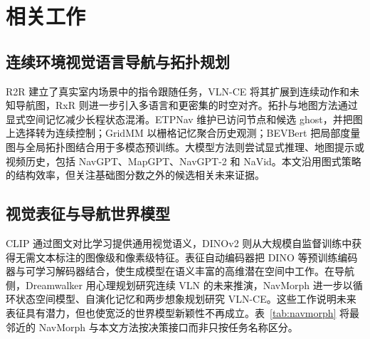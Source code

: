 \documentclass[UTF8,11pt]{ctexart}
\begin{document}
\section{相关工作}

\subsection{连续环境视觉语言导航与拓扑规划}

R2R 建立了真实室内场景中的指令跟随任务\cite{anderson2018r2r}，VLN-CE 将其扩展到连续动作和未知导航图\cite{krantz2020vlnce}，RxR 则进一步引入多语言和更密集的时空对齐\cite{ku2020rxr}。拓扑与地图方法通过显式空间记忆减少长程状态混淆。ETPNav 维护已访问节点和候选 ghost，并把图上选择转为连续控制\cite{an2025etpnav}；GridMM 以栅格记忆聚合历史观测\cite{wang2023gridmm}；BEVBert 把局部度量图与全局拓扑图结合用于多模态预训练\cite{an2023bevbert}。大模型方法则尝试显式推理、地图提示或视频历史，包括 NavGPT、MapGPT、NavGPT-2 和 NaVid\cite{zhou2024navgpt,chen2024mapgpt,zhou2024navgpt2,zhang2024navid}。本文沿用图式策略的结构效率，但关注基础图分数之外的候选相关未来证据。

\subsection{视觉表征与导航世界模型}

CLIP 通过图文对比学习提供通用视觉语义\cite{radford2021clip}，DINOv2 则从大规模自监督训练中获得无需文本标注的图像级和像素级特征\cite{oquab2023dinov2}。表征自动编码器把 DINO 等预训练编码器与可学习解码器结合，使生成模型在语义丰富的高维潜在空间中工作\cite{zheng2025rae}。在导航侧，Dreamwalker 用心理规划研究连续 VLN 的未来推演\cite{wang2023dreamwalker}，NavMorph 进一步以循环状态空间模型、自演化记忆和两步想象规划研究 VLN-CE\cite{yao2025navmorph}。这些工作说明未来表征具有潜力，但也使宽泛的世界模型新颖性不再成立。表~\ref{tab:navmorph} 将最邻近的 NavMorph 与本文方法按决策接口而非只按任务名称区分。
\end{document}
